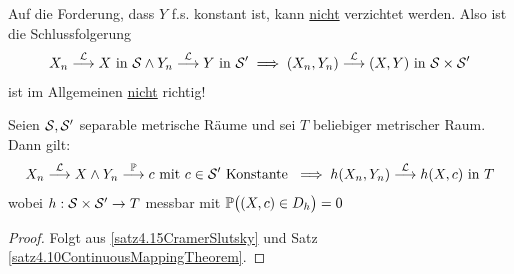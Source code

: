 \begin{bemerkungnr}\label{bemerkung4.16} %
Auf die Forderung, dass $Y$ f.s. konstant ist, kann \underline{nicht} verzichtet werden. Also ist die Schlussfolgerung
\begin{align*}
X_n\stackrel{\L}{\longrightarrow} X\text{ in }\S\wedge Y_n\stackrel{\L}{\longrightarrow} Y\text{ in }\S'
\implies(X_n,Y_n)\stackrel{\L}{\longrightarrow}(X,Y)\text{ in }\S\times\S'
\end{align*}
ist im Allgemeinen \underline{nicht} richtig!
\end{bemerkungnr}

\begin{korollar}\label{korollar4.17}
Seien $\S,\S'$ separable metrische Räume und sei $T$ beliebiger metrischer Raum. Dann gilt:
\begin{align*}
X_n\stackrel{\L}{\longrightarrow} X\wedge Y_n\stackrel{\P}{\longrightarrow} c\mit c\in\S'\text{ Konstante }
\implies h(X_n,Y_n)\stackrel{\L}{\longrightarrow} h(X,c)\text{ in }T
\end{align*}
wobei $h:\S\times\S'\to T$ messbar mit $\P\big((X,c)\in D_h\big)=0$
\end{korollar}
\begin{proof}
Folgt aus \ref{satz4.15CramerSlutsky} und Satz \ref{satz4.10ContinuousMappingTheorem}.
\end{proof}

